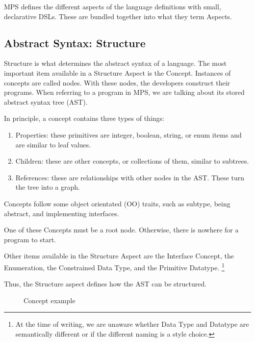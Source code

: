 MPS defines the different aspects of the language definitions with small, declarative DSLs.
These are bundled together into what they term Aspects.

\subsection{Abstract Syntax: Structure}
Structure is what determines the abstract syntax of a language.
The most important item available in a Structure Aspect is the Concept.
Instances of concepts are called nodes.
With these nodes, the developers construct their programs.
When referring to a program in MPS, we are talking about its stored abstract syntax tree (AST).

In principle, a concept contains three types of things:
\begin{enumerate}
    \setlength\itemsep{0em}
    \item Properties: these primitives are integer, boolean, string, or enum items and are similar to leaf values.
    \item Children: these are other concepts, or collections of them, similar to subtrees.
    \item References: these are relationships with other nodes in the AST. These turn the tree into a graph.
\end{enumerate}

Concepts follow some object orientated (OO) traits, such as subtype, being abstract, and implementing interfaces.

One of these Concepts must be a root node. 
Otherwise, there is nowhere for a program to start.

Other items available in the Structure Aspect are the Interface Concept, the Enumeration, the Constrained Data Type, and the Primitive Datatype.
\footnote{At the time of writing, we are unaware whether Data Type and Datatype are semantically different or if the different naming is a style choice.}

Thus, the Structure aspect defines how the AST can be structured.

\begin{figure}
    \centering
    \caption{Concept example}
    \label{fig:concept_example}
\end{figure}
 
